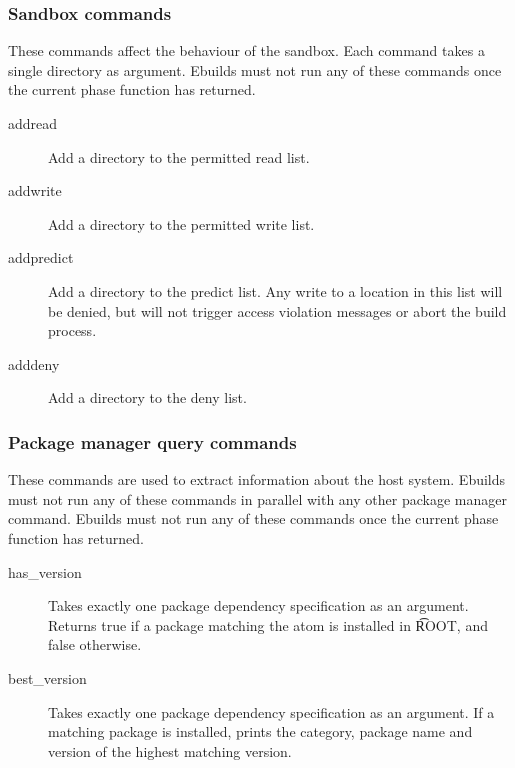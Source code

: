 \subsubsection{Sandbox commands}
These commands affect the behaviour of the sandbox. Each command takes a single directory as
argument. Ebuilds must not run any of these commands once the current phase function has returned.
\begin{description}
\item[addread] Add a directory to the permitted read list.
\item[addwrite] Add a directory to the permitted write list.
\item[addpredict] Add a directory to the predict list. Any write to a location in this list will be
    denied, but will not trigger access violation messages or abort the build process.
\item[adddeny] Add a directory to the deny list.
\end{description}

\subsubsection{Package manager query commands}
These commands are used to extract information about the host system. Ebuilds must not run any of
these commands in parallel with any other package manager command. Ebuilds must not run any of
these commands once the current phase function has returned.
\begin{description}
\item[has\_version] Takes exactly one package dependency specification as an argument. Returns
    true if a package matching the atom is installed in \t{ROOT}, and false otherwise.
\item[best\_version] Takes exactly one package dependency specification as an argument. If a
    matching package is installed, prints the category, package name and version of the highest
    matching version.
\end{description}

